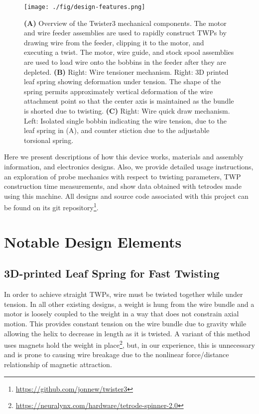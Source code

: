 \documentclass[11pt,a4paper]{article}
\begin{document}
\begin{figure}
\centering \texttt{[image: ./fig/design-features.png]}
\caption{\textbf{(A)} Overview of the Twister3 mechanical components. The
    motor and wire feeder assemblies are used to rapidly construct TWPs by
    drawing wire from the feeder, clipping it to the motor, and executing a
    twist. The motor, wire guide, and stock spool assemblies are used to
    load wire onto the bobbins in the feeder after they are depleted.
    \textbf{(B)} Right: Wire tensioner mechanism. Right: 3D printed
    leaf spring showing deformation under tension. The shape of the spring
    permits approximately vertical deformation of the wire attachment point
    so that the center axis is maintained as the bundle is shorted due to
    twisting. \textbf{(C)} Right: Wire quick draw mechanism. Left: Isolated
    single bobbin indicating the wire tension, due to the leaf spring in (A),
    and counter stiction due to the adjustable torsional spring.}
\label{f:design-features}
\end{figure}

Here we present descriptions of how this device works, materials and assembly
information, and electronics designs. Also, we provide detailed usage
instructions, an exploration of probe mechanics with respect to twisting
parameters, TWP construction time measurements, and show data obtained with
tetrodes made using this machine. All designs and source code associated with
this project can be found on its git
repository\footnote{\url{https://github.com/jonnew/twister3}}.

\section{Notable Design Elements}

\subsection{3D-printed Leaf Spring for Fast Twisting}
In order to achieve straight TWPs, wire must be twisted together while under
tension. In all other existing designs, a weight is hung from the wire bundle
and a motor is loosely coupled to the weight in a way that does not constrain
axial motion. This provides constant tension on the wire bundle due to gravity
while allowing the helix to decrease in length as it is twisted. A variant of
this method uses magnets hold the weight in
place\footnote{\url{https://neuralynx.com/hardware/tetrode-spinner-2.0}}, but,
in our experience, this is unnecessary and is prone to causing wire breakage
due to the nonlinear force/distance relationship of magnetic attraction.
\end{document}
